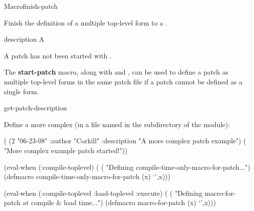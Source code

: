 \documentclass[10pt,twoside,english,pdftex]{article}
\begin{document}
\begin{functiondoc}{Macro}{finish-patch}{\superstar}
%
%

\fnsyntax 

\fnpurpose Finish the definition of a multiple top-level form  to
a .

\fnpackage {}

\fnmodule {}

\fnargs
\begin{args}{description}
\arg[form] A 
\end{args}

\fnerrors
A patch has not been started with .

\fndescription 
%
The \textbf{start-patch} macro, along with
 and
, can be used to define a patch as
multiple top-level forms in the same patch file if a patch cannot be defined
as a single  form.

\begin{alsos}{get-patch-description}
\also[patch]
\also[undefmethod]
\end{alsos}

\fnexample 
%
Define a more complex  (in a file named
 in the  subdirectory of
the module):
%
%
%
%
%
\W\supp
\begin{example}
  ( (2 "06-23-08" 
                  :author "Corkill"
                  :description "A more complex patch example")
      ( "More complex example patch started!"))

  (eval-when (:compile-toplevel)
    (
     ( "Defining compile-time-only-macro-for-patch...")
     (defmacro compile-time-only-macro-for-patch (x)
       `',x)))

  (eval-when (:compile-toplevel :load-toplevel :execute)
    (
     ( "Defining macro-for-patch at compile & load time...")
     (defmacro macro-for-patch (x)
       `',x)))\goodpagebreak


\end{example}
\end{functiondoc}
\end{document}
